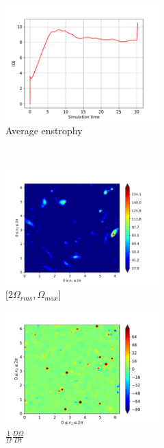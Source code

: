 \begin{figure}[H]
    \begin{subfigure}[H]{0.45\textwidth}
        \includegraphics[height=1.75in]{media/run-cds-65/enst-average1360}
        \caption{Average enstrophy}
    \end{subfigure}
    ~
    \begin{subfigure}[H]{0.45\textwidth}
        \includegraphics[height=1.75in]{media/run-cds-65/enst-2-1360}
        \caption{$[2\Omega_{rms}, \Omega_{max} $] }
    \end{subfigure}
    \newline
    \begin{subfigure}[H]{0.45\textwidth}
        \includegraphics[height=1.75in]{media/run-cds-65/enst-1360}
        \caption{$\frac{1}{\Omega} \frac{D \Omega}{Dt}$}
    \end{subfigure}
    ~
    \begin{subfigure}{0.45\textwidth}

\end{subfigure}
\end{figure}

